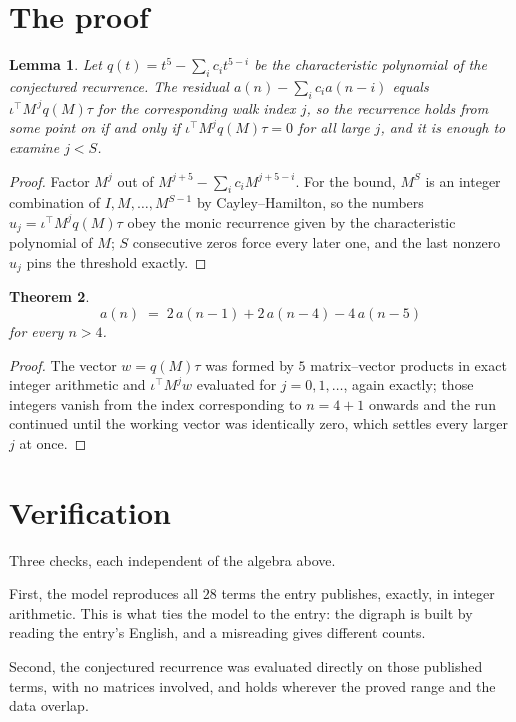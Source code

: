 \documentclass[11pt,a4paper]{article}
\theoremstyle{plain}
\newtheorem{theorem}{Theorem}
\newtheorem{lemma}[theorem]{Lemma}
\theoremstyle{definition}
\begin{document}
\section{The proof}

\begin{lemma}\label{lem:crit}
Let $q(t)=t^{5}-\sum_i c_it^{5-i}$ be the characteristic polynomial of the
conjectured recurrence. The residual $a(n)-\sum_ic_ia(n-i)$ equals
$\iota^{\!\top}M^{\,j}q(M)\tau$ for the corresponding walk index $j$, so the recurrence
holds from some point on if and only if $\iota^{\!\top}M^{j}q(M)\tau=0$ for all large $j$,
and it is enough to examine $j<S$.
\end{lemma}

\begin{proof}
Factor $M^{j}$ out of $M^{j+5}-\sum_ic_iM^{j+5-i}$. For the bound, $M^{S}$
is an integer combination of $I,M,\dots,M^{S-1}$ by Cayley--Hamilton, so the numbers
$u_j=\iota^{\!\top}M^{j}q(M)\tau$ obey the monic recurrence given by the characteristic
polynomial of $M$; $S$ consecutive zeros force every later one, and the last nonzero $u_j$
pins the threshold exactly.
\end{proof}

\begin{theorem}
\[
a(n)\;=\;2\,a(n-1) + 2\,a(n-4) - 4\,a(n-5)
\]
for every $n>4$.
\end{theorem}

\begin{proof}
The vector $w=q(M)\tau$ was formed by $5$ matrix--vector products in exact integer
arithmetic and $\iota^{\!\top}M^{j}w$ evaluated for $j=0,1,\dots$, again exactly; those
integers vanish from the index corresponding to $n=4+1$ onwards and the run continued
until the working vector was identically zero, which settles every larger $j$ at once.
\end{proof}

\section{Verification}

Three checks, each independent of the algebra above.

First, the model reproduces all $28$ terms the entry publishes, exactly, in integer
arithmetic. This is what ties the model to the entry: the digraph is built by reading the
entry's English, and a misreading gives different counts.

Second, the conjectured recurrence was evaluated directly on those published terms, with no
matrices involved, and holds wherever the proved range and the data overlap.
\end{document}
